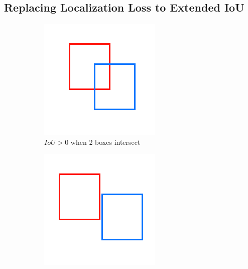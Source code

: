   \subsection{Replacing Localization Loss to Extended IoU}
  \begin{figure}
      \centering
      \begin{subfigure}[][][t]{0.3\textwidth}
        \includegraphics[width=1\linewidth]{figures/iounot0.png}
        \caption{$IoU > 0$ when 2 boxes intersect}
        \label{fig:iouexist}
      \end{subfigure}\hfill
      \begin{subfigure}[][][t]{0.3\textwidth}
        \includegraphics[width=1\linewidth]{figures/iou0near.png}

\end{subfigure}
\end{figure}
